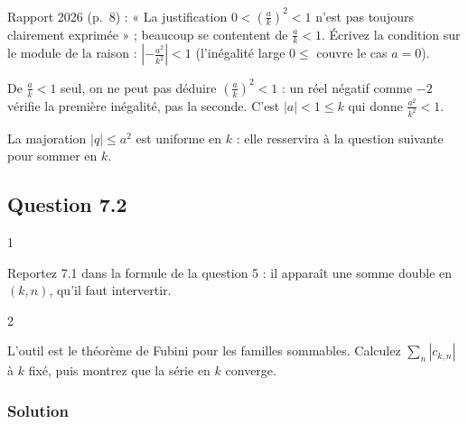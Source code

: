 \documentclass[11pt,a4paper]{article}
\begin{document}
\begin{jury}

Rapport 2026 (p.~8) : « La justification \(0 < \left(\frac{a}{k}\right)^2 < 1\) n'est pas toujours clairement exprimée » ; beaucoup se contentent de \(\frac ak<1\). Écrivez la condition sur le module de la raison : \(\left|-\frac{a^2}{k^2}\right|<1\) (l'inégalité large \(0\le\) couvre le cas \(a=0\)).

\end{jury}

\begin{piege}

De \(\frac ak<1\) seul, on ne peut pas déduire \(\left(\frac ak\right)^2<1\) : un réel négatif comme \(-2\) vérifie la première inégalité, pas la seconde. C'est \(|a|<1\le k\) qui donne \(\frac{a^2}{k^2}<1\).

\end{piege}

\begin{methode}

La majoration \(|q|\le a^2\) est uniforme en \(k\) : elle resservira à la question suivante pour sommer en \(k\).

\end{methode}

\hypertarget{question-7.2}{%
\subsection{Question 7.2}\label{question-7.2}}

\begin{indication}{1}

Reportez 7.1 dans la formule de la question 5 : il apparaît une somme double en \((k,n)\), qu'il faut intervertir.

\end{indication}

\begin{indication}{2}

L'outil est le théorème de Fubini pour les familles sommables. Calculez \(\sum_n|c_{k,n}|\) à \(k\) fixé, puis montrez que la série en \(k\) converge.

\end{indication}

\hypertarget{solution-18}{%
\subsubsection{Solution}\label{solution-18}}
\end{document}
